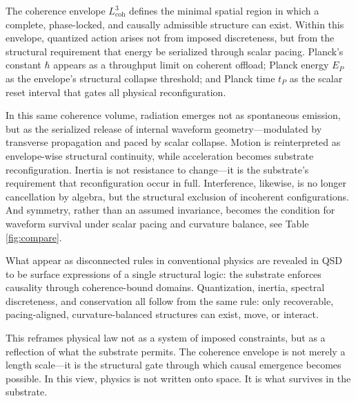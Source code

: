 \documentclass[entropy,article,submit,pdftex,moreauthors]{Definitions/mdpi}
\begin{document}
The coherence envelope \texorpdfstring{\( L_{\text{coh}}^3 \)}{Lcoh\^{}3} defines the minimal spatial region in which a complete, phase-locked, and causally admissible structure can exist. Within this envelope, quantized action arises not from imposed discreteness, but from the structural requirement that energy be serialized through scalar pacing. Planck’s constant \texorpdfstring{\( \hbar \)}{hbar} appears as a throughput limit on coherent offload; Planck energy \texorpdfstring{\( E_P \)}{Ep} as the envelope’s structural collapse threshold; and Planck time \texorpdfstring{\( t_P \)}{tP} as the scalar reset interval that gates all physical reconfiguration.

In this same coherence volume, radiation emerges not as spontaneous emission, but as the serialized release of internal waveform geometry—modulated by transverse propagation and paced by scalar collapse. Motion is reinterpreted as envelope-wise structural continuity, while acceleration becomes substrate reconfiguration. Inertia is not resistance to change—it is the substrate’s requirement that reconfiguration occur in full. Interference, likewise, is no longer cancellation by algebra, but the structural exclusion of incoherent configurations. And symmetry, rather than an assumed invariance, becomes the condition for waveform survival under scalar pacing and curvature balance, see Table \ref{fig:compare}.

What appear as disconnected rules in conventional physics are revealed in QSD to be surface expressions of a single structural logic: the substrate enforces causality through coherence-bound domains. Quantization, inertia, spectral discreteness, and conservation all follow from the same rule: only recoverable, pacing-aligned, curvature-balanced structures can exist, move, or interact.

This reframes physical law not as a system of imposed constraints, but as a reflection of what the substrate permits. The coherence envelope is not merely a length scale—it is the structural gate through which causal emergence becomes possible. In this view, physics is not written onto space. It is what survives in the substrate.
\end{document}
